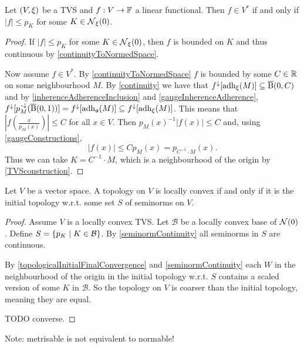 \begin{proposition} \label{gaugeMajorisation}
Let $\left( V,\xi \right)$ be a TVS and $f:V\to \mathbb{F}$ a linear functional. Then $f\in V^*$ \textup{if and only if} $|f| \leq p_K$ for some $K\in \operatorname{\mathcal{N}}_\xi(0)$.
\end{proposition}
\begin{proof}
If $|f| \leq p_K$ for some $K\in \operatorname{\mathcal{N}}_\xi(0)$, then $f$ is bounded on $K$ and thus continuous by \ref{continuityToNormedSpace}.

Now assume $f\in V^*$. By \ref{continuityToNormedSpace} $f$ is bounded by some $C\in \mathbb{R}$ on some neighbourhood $M$. By \ref{continuity} we have that $f^\downarrow[\operatorname{adh}_\xi(M)] \subseteq \operatorname{\overline{B}}(0,C)$ and by \ref{inherenceAdherenceInclusion} and \ref{gaugeInherenceAdherence}, $f^\downarrow[p_M^{\text{\hspace{0.15em}-}\downarrow}(\operatorname{\overline{B}}(0,1))] = f^\downarrow[\operatorname{adh}_\mathfrak{a}(M)] \subseteq f^\downarrow[\operatorname{adh}_\xi(M)]$. This means that $\left|f\left(\frac{x}{p_M(x)}\right)\right| \leq C$ for all $x\in V$. Then $p_M(x)^{-1}|f(x)| \leq C$ and, using \ref{gaugeConstructions},
\[ |f(x)| \leq C p_M(x) = p_{C^{-1}\cdot M}(x). \]
Thus we can take $K = C^{-1}\cdot M$, which is a neighbourhood of the origin by \ref{TVSconstruction}.
\end{proof}

\begin{proposition}
Let $V$ be a vector space. A topology on $V$ is locally convex \textup{if and only if} it is the initial topology w.r.t. some set $S$ of seminorms on $V$.
\end{proposition}
\begin{proof}
Assume $V$ is a locally convex TVS. Let $\mathcal{B}$ be a locally convex base of $\operatorname{\mathcal{N}}(0)$. Define $S = \left\{ p_K \;\middle|\; K\in \mathcal{B} \right\}$. By \ref{seminormContinuity} all seminorms in $S$ are continuous.

By \ref{topologicalInitialFinalConvergence} and \ref{seminormContinuity} each $W$ in the neighbourhood of the origin in the initial topology w.r.t. $S$ contains a scaled version of some $K$ in $\mathcal{B}$. So the topology on $V$ is coarser than the initial topology, meaning they are equal.

TODO converse.
\end{proof}
Note: metrisable is not equivalent to normable!






